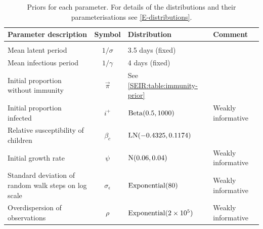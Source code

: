 \documentclass[thesis.tex]{subfiles}
\begin{document}
\begin{landscape}
\begin{table}
\begin{tabular}{l c l l}
    Parameter description & Symbol & Distribution & Comment \\
    \hline \\
    Mean latent period & $1/\sigma$ & 3.5 days (fixed) & \Textcite{zhaoEstimating} \\
    Mean infectious period & $1/\gamma$ & 4 days (fixed) & \Textcite{zhaoEstimating} \\
    Initial proportion without immunity & $\vec\pi$ & See \cref{SEIR:table:immunity-prior} & \\
    Initial proportion infected & $i^+$ & $\operatorname{Beta}(0.5, 1000)$ & Weakly informative \\
    Relative susceptibility of children & $\beta_c$ & $\operatorname{LN}(-0.4325, 0.1174)$ &  \\
    Initial growth rate & $\psi$ & $\operatorname{N}(0.06, 0.04)$ & Weakly informative \\
    Standard deviation of random walk steps on log scale & $\sigma_\epsilon$ & $\operatorname{Exponential}(80)$ & Weakly informative \\ %
    Overdispersion of observations & $\rho$ & $\operatorname{Exponential}(2 \times 10^5)$ & Weakly informative
\end{tabular}
\caption[SEIR model priors]{Priors for each parameter. For details of the distributions and their parameterisations see \cref{E-distributions}.}
\label{SEIR:table:priors}
\end{table}


\end{landscape}
\end{document}
